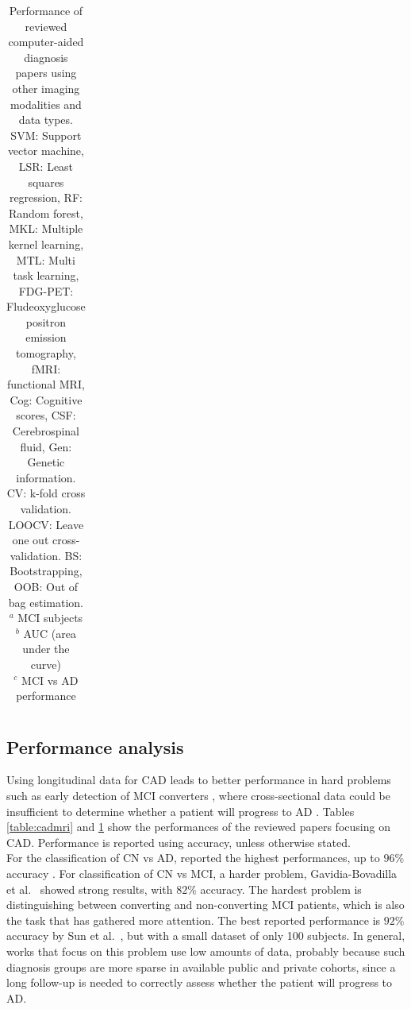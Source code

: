 \begin{table}
{\begin{tabular}{@{}lcccccllllccc@{}}
\end{tabular}}
\caption[Performance of reviewed computer-aided diagnosis papers using other imaging modalities and data types.]{\footnotesize Performance of reviewed computer-aided diagnosis papers using other imaging modalities and data types. SVM: Support vector machine, LSR: Least squares regression, RF: Random forest, MKL: Multiple kernel learning, MTL: Multi task learning, FDG-PET: Fludeoxyglucose positron emission tomography, fMRI: functional MRI, Cog: Cognitive scores, CSF: Cerebrospinal fluid, Gen: Genetic information. CV: k-fold cross validation. LOOCV: Leave one out cross-validation. BS: Bootstrapping, OOB: Out of bag estimation.  \\
          $^{a}$ MCI subjects \\
         $^{b}$ AUC (area under the curve) \\
          $^{c}$ MCI vs AD performance \\
         }\label{table:cadmulti}
\end{table}
\normalsize

\subsection{Performance analysis}

Using longitudinal data for CAD leads to better performance in hard problems such as early detection of MCI converters \cite{Ardekani2016,Sanroma2017,Sun2017,Thung2016}, where cross-sectional data could be insufficient to determine whether a patient will progress to AD \cite{cuingnet}. Tables \ref{table:cadmri} and \ref{table:cadmulti} show the performances of the reviewed papers focusing on CAD. Performance is reported using accuracy, unless otherwise stated. \\

For the classification of CN vs AD, \cite{Gavidia-Bovadilla2017,Li2012,Ortiz2017,Shi2015,Shi2017} reported the highest performances, up to $96\%$ accuracy \cite{Li2012}. For classification of CN vs MCI, a harder problem, Gavidia-Bovadilla et al.\ \cite{Gavidia-Bovadilla2017} showed strong results, with $82\%$ accuracy. The hardest problem is distinguishing between converting and non-converting MCI patients, which is also the task that has gathered more attention. The best reported performance is $92\%$ accuracy by Sun et al.\ \cite{Sun2017}, but with a small dataset of only 100 subjects. In general, works that focus on this problem use low amounts of data, probably because such diagnosis groups are more sparse in available public and private cohorts, since a long follow-up is needed to correctly assess whether the patient will progress to AD. \\


